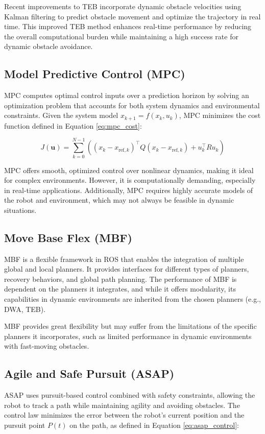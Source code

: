 \documentclass[conference]{IEEEtran}
\begin{document}
Recent improvements to TEB incorporate dynamic obstacle velocities using Kalman filtering to predict obstacle movement and optimize the trajectory in real time. This improved TEB method \cite{chen2021dynamic} enhances real-time performance by reducing the overall computational burden while maintaining a high success rate for dynamic obstacle avoidance.

\subsection{Model Predictive Control (MPC)}
MPC computes optimal control inputs over a prediction horizon by solving an optimization problem that accounts for both system dynamics and environmental constraints. Given the system model \(x_{k+1} = f(x_k, u_k)\), MPC minimizes the cost function defined in Equation \eqref{eq:mpc_cost}:

\begin{equation}
\label{eq:mpc_cost}
J(\mathbf{u}) = \sum_{k=0}^{N-1} \left( (x_k - x_{\text{ref},k})^\top Q (x_k - x_{\text{ref},k}) + u_k^\top R u_k \right)
\end{equation}

MPC offers smooth, optimized control over nonlinear dynamics, making it ideal for complex environments. However, it is computationally demanding, especially in real-time applications. Additionally, MPC requires highly accurate models of the robot and environment, which may not always be feasible in dynamic situations.

\subsection{Move Base Flex (MBF)}
MBF is a flexible framework in ROS that enables the integration of multiple global and local planners. It provides interfaces for different types of planners, recovery behaviors, and global path planning. The performance of MBF is dependent on the planners it integrates, and while it offers modularity, its capabilities in dynamic environments are inherited from the chosen planners (e.g., DWA, TEB).

MBF provides great flexibility but may suffer from the limitations of the specific planners it incorporates, such as limited performance in dynamic environments with fast-moving obstacles.

\subsection{Agile and Safe Pursuit (ASAP)}
ASAP uses pursuit-based control combined with safety constraints, allowing the robot to track a path while maintaining agility and avoiding obstacles. The control law minimizes the error between the robot’s current position and the pursuit point \(P(t)\) on the path, as defined in Equation \eqref{eq:asap_control}:
\end{document}

